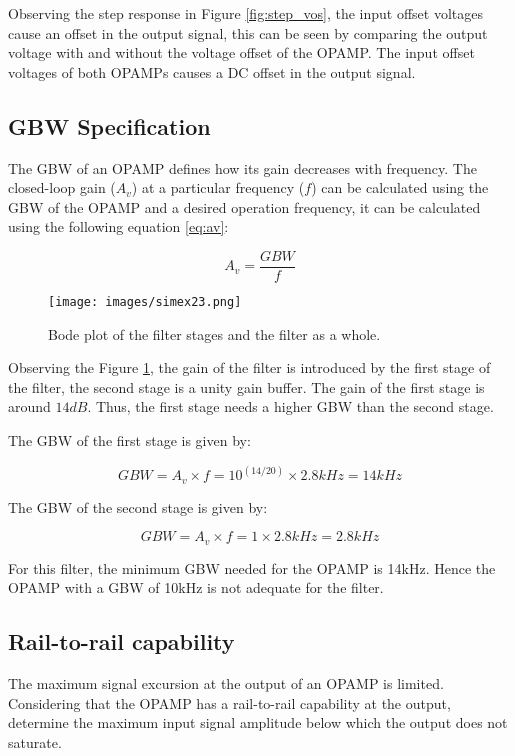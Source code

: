 Observing the step response in Figure \ref{fig:step_vos}, the input offset voltages cause an offset in the output signal, this can be seen by comparing the output voltage with and without the voltage offset of the OPAMP. The input offset voltages of both OPAMPs causes a DC offset in the output signal.

\subsection{GBW Specification}
The GBW of an OPAMP defines how its gain decreases with frequency. The closed-loop gain ($A_{v}$) at a particular frequency ($f$) can be calculated using the GBW of the OPAMP and a desired operation frequency, it can be calculated using the following equation \ref{eq:av}:

\begin{equation}
    A_{v} = \frac{GBW}{f}
    \label{eq:av}
\end{equation}

\begin{figure}[H]
    \centering
    \texttt{[image: images/simex23.png]}
    \caption{Bode plot of the filter stages and the filter as a whole.}
    \label{fig:bode-stages}
\end{figure}

Observing the Figure \ref{fig:bode-stages}, the gain of the filter is introduced by the first stage of the filter, the second stage is a unity gain buffer. The gain of the first stage is around $14dB$. Thus, the first stage needs a higher GBW than the second stage. 

The GBW of the first stage is given by:

\begin{equation}
    GBW = A_v \times f = 10^{(14/20)} \times 2.8kHz = 14kHz
\end{equation}

The GBW of the second stage is given by:

\begin{equation}
    GBW = A_v \times f = 1 \times 2.8kHz = 2.8kHz
\end{equation}

For this filter, the minimum GBW needed for the OPAMP is 14kHz. Hence the OPAMP with a GBW of 10kHz is not adequate for the filter.

\subsection{Rail-to-rail capability}
The maximum signal excursion at the output of an OPAMP is limited. Considering that the
OPAMP has a rail-to-rail capability at the output, determine the maximum input signal
amplitude below which the output does not saturate.

